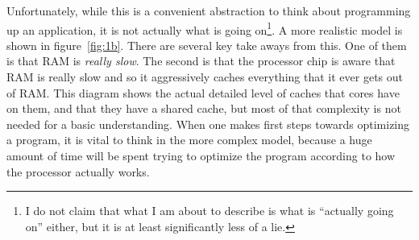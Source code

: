 Unfortunately, while this is a convenient abstraction to think about programming up an application, it
is not actually what is going on\footnote{I do not claim that what I am about to describe is what is ``actually going on'' either,
but it is at least significantly less of a lie.}. A more realistic model is shown in figure~\ref{fig:1b}. There are
several key take aways from this. One of them is that RAM is \textit{really slow}. The second is that the processor
chip is aware that RAM is really slow and so it aggressively caches everything that it ever gets out of RAM. This diagram
shows the actual detailed level of caches that cores have on them, and that they have a shared cache, but most of that
complexity is not needed for a basic understanding. When one makes first steps towards optimizing a program, it is vital
to think in the more complex model, because a huge amount of time will be spent trying to optimize the program according
to how the processor actually works.

